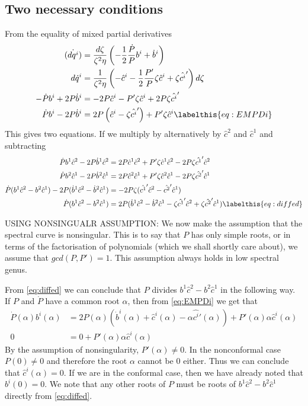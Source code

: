 \subsection{Two necessary conditions}
From the equality of mixed partial derivatives
\begin{align*}
\dot{(dq^i)} &= \frac{d\zeta}{\zeta^2\eta}\left( -\frac{1}{2}\frac{\dot P}{P}b^i + \dot b^i \right) \\
d\dot q^i & = \frac{1}{\zeta^2\eta}\left( -\hat c^i -\frac{1}{2}\frac{P'}{P}\zeta\hat c^i + \zeta\hat {c^i}'\right)d\zeta \\
-\dot P b^i + 2P \dot b^i & = -2P \hat c^i -P'\zeta\hat c^i + 2P\zeta\hat {c^i}' \\
\dot P b^i - 2P\dot b^i &= 2P\left( \hat c^i - \zeta\hat {c^i}'\right) + P'\zeta\hat c^i \labelthis{eq:EMPDi}
\end{align*}
This gives two equations. If we multiply by alternatively by $\hat c^2$ and $\hat c^1$ and subtracting
\begin{align*}
\dot P b^1\hat c^2 - 2P \dot b^1\hat c^2 & = 2P \hat c^1\hat c^2 +P'\zeta\hat c^1\hat c^2 - 2P\zeta\hat {c^1}'\hat c^2 \\
\dot P b^2\hat c^1 - 2P \dot b^2\hat c^1 & = 2P \hat c^2\hat c^1 +P'\zeta\hat c^2\hat c^1 - 2P\zeta\hat {c^2}'\hat c^1 \\
\dot P (b^1\hat c^2 - b^2\hat c^1) - 2P (\dot b^1\hat c^2 - \dot b^2\hat c^1) & = - 2P\zeta(\hat {c^1}'\hat c^2 - \hat {c^2}'\hat c^1) \\
\dot P (b^1\hat c^2 - b^2\hat c^1) & =  2P(\dot b^1\hat c^2 - \dot b^2\hat c^1 - \zeta\hat {c^1}'\hat c^2 + \zeta\hat {c^2}'\hat c^1)\labelthis{eq:diffed}
\end{align*}

USING NONSINGUALR ASSUMPTION:
We now make the assumption that the spectral curve is nonsingular. This is to say that $P$ has only simple roots, or in terms of the factorisation of polynomials (which we shall shortly care about), we assume that $gcd(P,P') = 1$. This assumption always holds in low spectral genus.

From \eqref{eq:diffed} we can conclude that $P$ divides $b^1\hat c^2 - b^2\hat c^1$ in the following way. If $P$ and $\dot P$ have a common root $\alpha$, then from \eqref{eq:EMPDi} we get that
\begin{align*}
\dot P(\alpha) b^i(\alpha) &= 2P(\alpha)\left( \dot b^i(\alpha) + \hat c^i(\alpha) - \alpha\hat {c^i}'(\alpha)\right) +P'(\alpha)\alpha\hat c^i(\alpha) \\
0 &= 0 + P'(\alpha)\alpha\hat c^i(\alpha)
\end{align*}
By the assumption of nonsingularity, $P'(\alpha)\neq 0$. In the nonconformal case $P(0) \neq 0$ and therefore the root $α$ cannot be $0$ either. Thus we can conclude that $\hat{c}^i(\alpha)=0$. If we are in the conformal case, then we have already noted that $b^i(0)=0$. We note that any other roots of $P$ must be roots of $b^1\hat c^2 - b^2 \hat c^1$ directly from \eqref{eq:diffed}.

